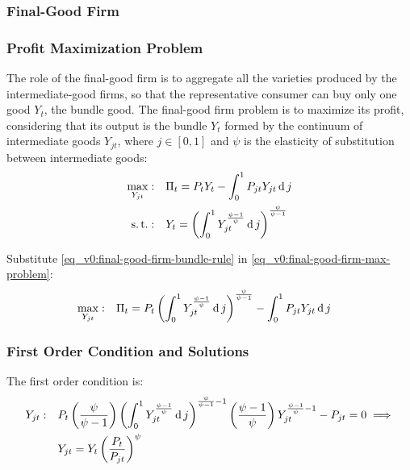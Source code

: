 \documentclass[
thesis.tex
]{subfiles}
\begin{document}
	
	\subsubsection{Final-Good Firm}
	
	\subsubsection*{Profit Maximization Problem}
	
	The role of the final-good firm is to aggregate all the varieties produced by the intermediate-good firms, so that the representative consumer can buy only one good $Y_t$, the bundle good. The final-good firm problem is to maximize its profit, considering that its output is the bundle $Y_t$ formed by the continuum of intermediate goods $Y_{jt}$, where $j \in [0,1]$ and $\psi$ is the elasticity of substitution between intermediate goods:
	\begin{align}
		\label{eq_v0:final-good-firm-max-problem}
		\max_{Y_{jt}}: &\quad \Pi_t = P_t Y_t - \int_{0}^{1} P_{jt} Y_{jt} \operatorname{d} j\\
		\label{eq_v0:final-good-firm-bundle-rule}
		\operatorname{s.t.}: & \quad Y_t = \left( \int_{0}^{1} Y_{jt}^{\frac{\psi-1}{\psi}} \operatorname{d} j \right)^{\frac{\psi}{\psi-1}}
	\end{align}
	
	Substitute \ref{eq_v0:final-good-firm-bundle-rule} in \ref{eq_v0:final-good-firm-max-problem}:
	\begin{align}
		\label{eq_v0:final-good-firm-max-problem-2}
		\max_{Y_{jt}}: & \quad \Pi_t = P_t \left( \int_{0}^{1} Y_{jt}^{\frac{\psi-1}{\psi}} \operatorname{d} j \right)^{\frac{\psi}{\psi-1}} - \int_{0}^{1} P_{jt} Y_{jt} \operatorname{d} j
	\end{align}
	
	\subsubsection*{First Order Condition and Solutions}
	
	The first order condition is:
	\begin{align}
		Y_{jt}:\quad & P_t \left( \frac{\psi}{\psi-1} \right) \left( \int_{0}^{1} Y_{jt}^{\frac{\psi-1}{\psi}} \operatorname{d} j \right)^{\frac{\psi}{\psi-1}-1} \left( \frac{\psi-1}{\psi} \right) Y_{jt}^{\frac{\psi-1}{\psi}-1} - P_{jt} = 0 \implies \nonumber \\
		\label{eq_v0:final-good-firm-FOC}
		& Y_{jt} = Y_t \left( \frac{P_t}{P_{jt}} \right)^{\psi}
	\end{align}
	
\end{document}
